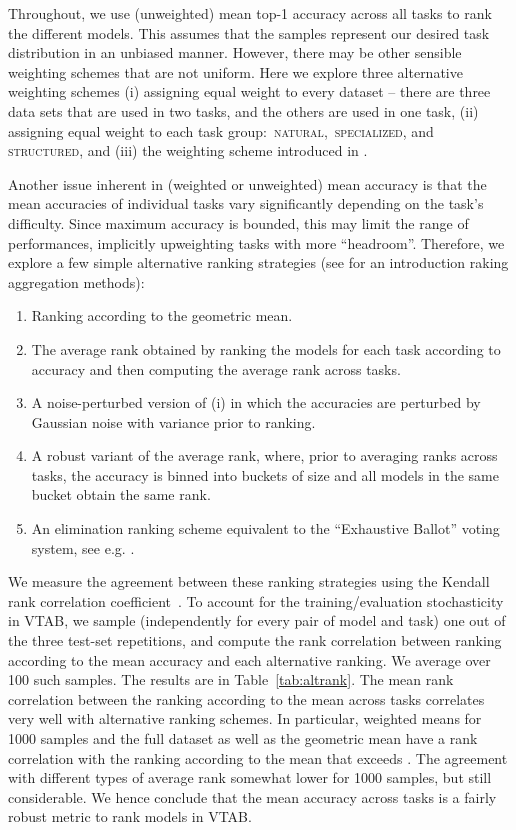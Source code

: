 \documentclass{article}
\DeclareRobustCommand{\taskNatural}{\raisebox{0.5pt}{\tikz{\fill[natural] (0cm,0cm) circle (.5ex);}}\,\textsc{natural}}
\DeclareRobustCommand{\taskSpecialized}{\raisebox{0.5pt}{\tikz{\fill[specialized] (0,0) circle (.5ex);}}\,\textsc{specialized}}
\DeclareRobustCommand{\taskStructured}{\raisebox{0.5pt}{\tikz{\fill[structured] (0,0) circle (.5ex);}}\,\textsc{structured}}
\begin{document}
Throughout, we use (unweighted) mean top-1 accuracy across all tasks to rank the  different models. This assumes that the samples represent our desired task distribution  in an unbiased manner. However, there may be other sensible weighting schemes that are not uniform. Here we explore three alternative  weighting schemes (i) assigning equal weight to every dataset -- there are three data sets that are used in two tasks, and the others are used in one task, (ii) assigning equal weight to each task group: \taskNatural{}, \taskSpecialized{}, and \taskStructured{}, and (iii) the weighting scheme introduced in \citet{balduzzi2018}.

Another issue inherent in (weighted or unweighted) mean accuracy is that the mean accuracies of individual tasks vary significantly depending on the task's difficulty. Since maximum accuracy is bounded, this may limit the range of performances, implicitly upweighting tasks with more ``headroom''. Therefore, we explore a few simple alternative ranking strategies (see \citet{dwork2001rank} for an introduction raking aggregation methods): 
\begin{enumerate}[label=(\roman*)]
\item Ranking according to the geometric mean.
\item The average rank obtained by ranking the models for each task according to accuracy and then computing the average rank across tasks.
\item A noise-perturbed version of (i) in which the accuracies are perturbed by Gaussian noise with variance  prior to ranking.
\item A robust variant of the average rank, where, prior to averaging ranks across tasks, the accuracy is binned into buckets of size  and all models in the same bucket obtain the same rank.
\item An elimination ranking scheme equivalent to the ``Exhaustive Ballot'' voting system, see e.g. \citep{shahandashti2016electoral}.
\end{enumerate}
We measure the agreement between these ranking strategies using the Kendall rank correlation coefficient~\citep{kendall1945treatment}. To account for the training/evaluation stochasticity in VTAB, we sample (independently for every pair of model and task) one out of the three test-set repetitions, and compute the rank correlation between ranking according to the mean accuracy and each alternative ranking. We average over 100 such samples. The results are in Table~\ref{tab:altrank}. The mean rank correlation between the ranking according to the mean across tasks correlates very well with alternative ranking schemes. In particular, weighted means for 1000 samples and the full dataset as well as the geometric mean have a rank correlation with the ranking according to the mean that exceeds . The agreement with different types of average rank somewhat lower for 1000 samples, but still considerable. We hence conclude that the mean accuracy across tasks is a fairly robust metric to rank models in VTAB.
\end{document}
